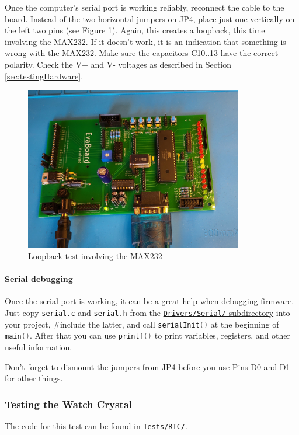 \documentclass{article}
\newenvironment{note}{\begin{tcolorbox}[colback=blue!5!white,colframe=blue!75!black,title=\textbf{Note}]}{\end{tcolorbox}}
\newcommand{\file}[1]{\texttt{#1}}
\begin{document}
Once the computer's serial port is working reliably, reconnect the cable to the board. Instead of the two horizontal jumpers on JP4, place just one vertically on the left two pins (see Figure \ref{fig:max232Loopback}). Again, this creates a loopback, this time involving the MAX232. If it doesn't work, it is an indication that something is wrong with the MAX232. Make sure the capacitors C10..13 have the correct polarity. Check the V+ and V- voltages as described in Section \ref{sec:testingHardware}. 
\begin{figure}[htb]
\centering
\includegraphics[width=0.85\textwidth]{Pictures/Max232Loopback.jpg}
\caption{Loopback test involving the MAX232}
\label{fig:max232Loopback}
\end{figure}

\paragraph{Serial debugging}
Once the serial port is working, it can be a great help when debugging firmware. Just copy \file{serial.c} and \file{serial.h} from the \href{../Drivers/Serial/}{\file{Drivers/Serial/} subdirectory} into your project, \#include the latter, and call \lstinline[language=C]{serialInit()} at the beginning of \lstinline[language=C]{main()}. After that you can use \lstinline[language=C]{printf()} to print variables, registers, and other useful information. 

\begin{note}
Don't forget to dismount the jumpers from JP4 before you use Pins D0 and D1 for other things. 
\end{note}

\subsubsection{Testing the Watch Crystal}\label{sec:testY2}
The code for this test can be found in \href{../Tests/RTC/}{\file{Tests/RTC/}}. 
\end{document}
